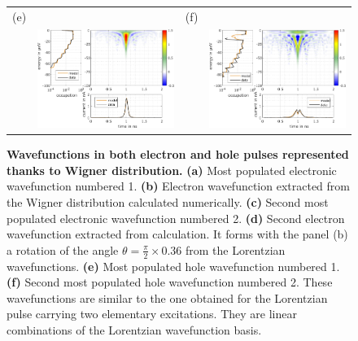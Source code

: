 \begin{figure}[hptb]
\begin{center}
\begin{tabular}{c c c c}
			(e) & & (f) & \\
			& \includegraphics[width = 6.5 cm]{./chap1/wannierwigAC_Data_leviton_40ps_1e_JMAP_f_vf-ho-0} &
			& \includegraphics[width = 6.5 cm]{./chap1/wannierwigAC_Data_leviton_40ps_1e_JMAP_f_vf-ho-1}
		\end{tabular} 
	\end{center}
	\caption{ \textbf{Wavefunctions in both electron and hole pulses represented thanks to Wigner distribution.} \textbf{(a)} Most populated electronic wavefunction numbered 1. \textbf{(b)} Electron wavefunction extracted from the Wigner distribution calculated numerically. \textbf{(c)} Second most populated electronic wavefunction numbered 2. \textbf{(d)} Second electron wavefunction extracted from calculation. It forms with the panel (b) a rotation of the angle $\theta = \frac{\pi}{2}\times 0.36$ from the Lorentzian wavefunctions. \textbf{(e)} Most populated hole wavefunction numbered 1. \textbf{(f)} Second most populated hole wavefunction numbered 2. These wavefunctions are similar to the one obtained for the Lorentzian pulse carrying two elementary excitations. They are linear combinations of the Lorentzian wavefunction basis.}
	\label{fig: wannier du 1e 40ps AC}
\end{figure}

